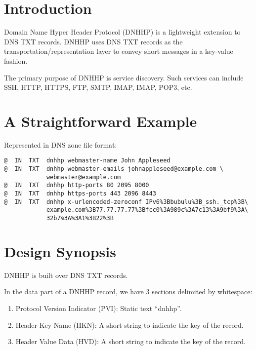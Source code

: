 \documentclass[a4paper,11pt]{article}
\begin{document}

\fulldoctitle


\section*{Introduction}

Domain Name Hyper Header Protocol (DNHHP) is a lightweight extension to DNS TXT records.
DNHHP uses DNS TXT records as the transportation/representation layer to convey short messages in a key-value fashion.

The primary purpose of DNHHP is service discovery.
Such services can include SSH, HTTP, HTTPS, FTP, SMTP, IMAP, IMAP, POP3, etc.

\tableofcontents\clearpage




\section{A Straightforward Example}

Represented in DNS zone file format:

\begin{lstlisting}
@  IN  TXT  dnhhp webmaster-name John Appleseed
@  IN  TXT  dnhhp webmaster-emails johnappleseed@example.com \
            webmaster@example.com
@  IN  TXT  dnhhp http-ports 80 2095 8000
@  IN  TXT  dnhhp https-ports 443 2096 8443
@  IN  TXT  dnhhp x-urlencoded-zeroconf IPv6%3Bbubulu%3B_ssh._tcp%3B\
            example.com%3B77.77.77.77%3Bfcc0%3A989c%3A7c13%3A9bf9%3A\
            32b7%3A%3A1%3B22%3B
\end{lstlisting}







\section{Design Synopsis}

DNHHP is built over DNS TXT records.

In the data part of a DNHHP record, we have 3 sections delimited by whitespace:

\begin{enumerate}
	\item Protocol Version Indicator (PVI): Static text ``dnhhp''.
	\item Header Key Name (HKN): A short string to indicate the key of the record.
	\item Header Value Data (HVD): A short string to indicate the key of the record.
\end{enumerate}
\end{document}
